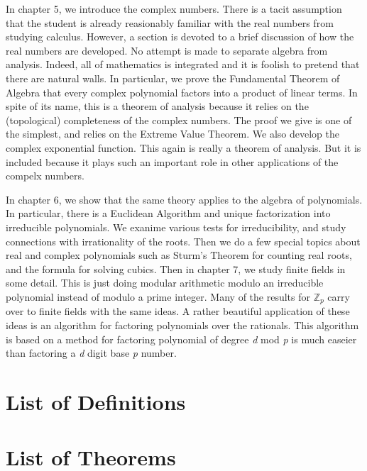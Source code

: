 \documentclass[11pt, oneside]{book}
\theoremstyle{break}
\newcommand{\bb}[1]{\mathbb{#1}}			%
\begin{document}
In chapter 5, we introduce the complex numbers. There is a tacit assumption that the student is already reasionably familiar with the real numbers from studying calculus. However, a section is devoted to a brief discussion of how the real numbers are developed. No attempt is made to separate algebra from analysis. Indeed, all of mathematics is integrated and it is foolish to pretend that there are natural walls. In particular, we prove the Fundamental Theorem of Algebra that every complex polynomial factors into a product of linear terms. In spite of its name, this is a theorem of analysis because it relies on the (topological) completeness of the complex numbers. The proof we give is one of the simplest, and relies on the Extreme Value Theorem. We also develop the complex exponential function. This again is really a theorem of analysis. But it is included because it plays such an important role in other applications of the compelx numbers.

In chapter 6, we show that the same theory applies to the algebra of polynomials. In particular, there is a Euclidean Algorithm and unique factorization into irreducible polynomials. We exanime various tests for irreducibility, and study connections with irrationality of the roots. Then we do a few special topics about real and complex polynomials such as Sturm's Theorem for counting real roots, and the formula for solving cubics. Then in chapter 7, we study finite fields in some detail. This is just doing modular arithmetic modulo an irreducible polynomial instead of modulo a prime integer. Many of the results for $\bb{Z}_p$ carry over to finite fields with the same ideas. A rather beautiful application of these ideas is an algorithm for factoring polynomials over the rationals. This algorithm is based on a method for factoring polynomial of degree \textit{d} mod \textit{p} is much easeier than factoring a \textit{d} digit base \textit{p} number.

\tableofcontents

\chapter*{List of Definitions}

\chapter*{List of Theorems}
\end{document}
